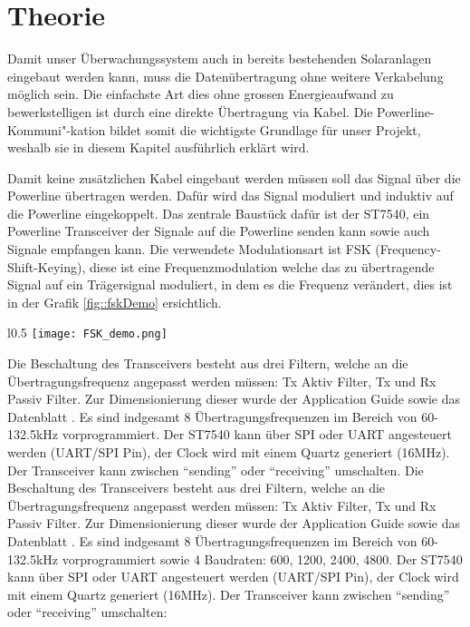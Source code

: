 \section{Theorie}

Damit unser Überwachungssystem auch in bereits bestehenden Solaranlagen eingebaut werden kann, muss die Datenübertragung ohne weitere Verkabelung möglich sein. Die einfachste Art dies ohne grossen Energieaufwand zu bewerkstelligen ist durch eine direkte Übertragung via Kabel. Die Powerline-Kommuni"-kation bildet somit die wichtigste Grundlage für unser Projekt, weshalb sie in diesem Kapitel ausführlich erklärt wird. 


Damit keine zusätzlichen Kabel eingebaut werden müssen soll das Signal über die Powerline übertragen werden. Dafür wird das Signal moduliert und induktiv auf die Powerline eingekoppelt. Das zentrale Baustück dafür ist der ST7540, ein Powerline Transceiver der Signale auf die Powerline senden kann sowie auch Signale empfangen kann. Die verwendete Modulationsart ist FSK (Frequency-Shift-Keying), diese ist eine Frequenzmodulation welche das zu übertragende Signal auf ein Trägersignal moduliert, in dem es die Frequenz verändert, dies ist in der Grafik \ref{fig::fskDemo} ersichtlich.

\begin{wrapfigure}{l}{0.5\textwidth}
\centering
\texttt{[image: FSK\_demo.png]}%
\caption{Prinzip der FSK Modulation \cite{fskDemo_wiki} }
\label{fig::fskDemo}
\end{wrapfigure}

Die Beschaltung des Transceivers besteht aus drei Filtern, welche an die Übertragungsfrequenz angepasst werden müssen: Tx Aktiv Filter, Tx und Rx Passiv Filter. Zur Dimensionierung dieser wurde der Application Guide \cite{Applic_Guide_ST7540} sowie das Datenblatt \cite{Datasheet_ST7540}. Es sind indgesamt 8 Übertragungsfrequenzen im Bereich von 60-132.5kHz vorprogrammiert. Der ST7540 kann über SPI oder UART angesteuert werden (UART/SPI Pin), der Clock wird mit einem Quartz generiert (16MHz). Der Transceiver kann zwischen ``sending'' oder ``receiving'' umschalten.
Die Beschaltung des Transceivers besteht aus drei Filtern, welche an die Übertragungsfrequenz angepasst werden müssen: Tx Aktiv Filter, Tx und Rx Passiv Filter. Zur Dimensionierung dieser wurde der Application Guide \cite{Applic_Guide_ST7540} sowie das Datenblatt \cite{Datasheet_ST7540}. Es sind indgesamt 8 Übertragungsfrequenzen im Bereich von 60-132.5kHz vorprogrammiert sowie 4 Baudraten: 600, 1200, 2400, 4800. Der ST7540 kann über SPI oder UART angesteuert werden (UART/SPI Pin), der Clock wird mit einem Quartz generiert (16MHz). Der Transceiver kann zwischen ``sending'' oder ``receiving'' umschalten:

